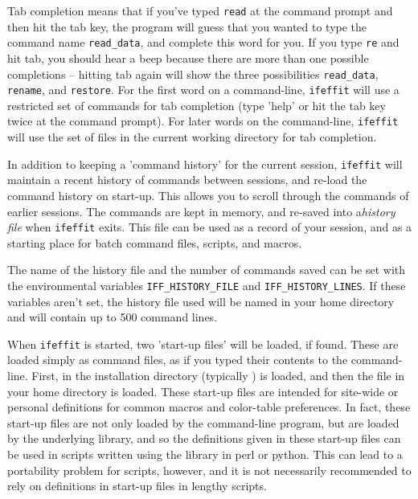 \documentclass[11pt]{article}
\begin{document}
Tab completion means that if you've typed {\tt{read}} at the command prompt
and then hit the tab key, the program will guess that you wanted to type
the command name {\tt{read\_data}}, and complete this word for you.  If you
type {\tt{re}} and hit tab, you should hear a beep because there are more
than one possible completions -- hitting tab again will show the three
possibilities {\tt{read\_data}}, {\tt{rename}}, and {\tt{restore}}.  For
the first word on a command-line, {\tt{ifeffit}} will use a restricted set
of commands for tab completion (type 'help' or hit the tab key twice at the
command prompt).  For later words on the command-line, {\tt{ifeffit}} will
use the set of files in the current working directory for tab completion.

In addition to keeping a 'command history' for the current session,
{\tt{ifeffit}} will maintain a recent history of commands between sessions,
and re-load the command history on start-up.  This allows you to scroll
through the commands of earlier sessions.  The commands are kept in memory,
and re-saved into a{\emph{history file}} when {\tt{ifeffit}} exits.  This
file can be used as a record of your session, and as a starting place for
batch command files, scripts, and macros.

The name of the history file and the number of commands saved can be set
with the environmental variables {\tt{IFF\_HISTORY\_FILE}} and
{\tt{IFF\_HISTORY\_LINES}}.  If these variables aren't set, the history
file used will be named {} in your home directory and
will contain up to 500 command lines.

When {\tt{ifeffit}} is started, two 'start-up files' will be loaded, if
found.  These are loaded simply as command files, as if you typed their
contents to the command-line.  First, {} in the
installation directory (typically {}) is
loaded, and then the file {} in your home directory is
loaded.  These start-up files are intended for site-wide or personal
definitions for common macros and color-table preferences.  In fact, these
start-up files are not only loaded by the command-line program, but are
loaded by the underlying library, and so the definitions given in these
start-up files can be used in scripts written using the {\ifeffit} library
in perl or python.  This can lead to a portability problem for scripts,
however, and it is not necessarily recommended to rely on definitions in
start-up files in lengthy scripts.
\end{document}
